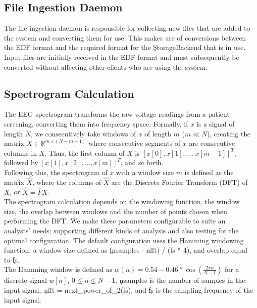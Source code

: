 \subsection{File Ingestion Daemon}

The file ingestion daemon is responsible for collecting new files that are
added to the system and converting them for use. This makes use of conversions
between the EDF format and the required format for the \c{StorageBackend} that
is in use. Input files are initially received in the EDF format and must
subsequently be converted without affecting other clients who are using the
system.

\subsection{Spectrogram Calculation}\label{compute-ch:design-spectrogram}

The EEG spectrogram transforms the raw voltage readings from a patient
screening, converting them into frequency space. Formally, if $x$ is a signal
of length $N$, we consecutively take windows of $x$ of length $m$ ($m \ll N$),
creating the matrix $X \in \mathbb{R}^{m \times (N - m + 1)}$ where consecutive
segments of $x$ are consecutive columns in $X$. Thus, the first column of $X$
is $[x[0], x[1], \ldots, x[m-1]]^T$, followed by $[x[1], x[2], \ldots,
x[m]]^T$, and so forth. \\

Following this, the spectrogram of $x$ with a window size $m$ is defined as the
matrix $\hat{X}$, where the columns of $\hat{X}$ are the Discrete Fourier
Transform (DFT) of $X$, or $\hat{X} = \bar{F}X$. \\

The spectrogram calculation depends on the windowing function, the window size,
the overlap between windows and the number of points chosen when performing the
DFT. We make these parameters configurable to suite an analysts' needs;
supporting different kinds of analysis and also testing for the optimal
configuration. The default configuration uses the Hamming windowing function, a
window size defined as \c{(nsamples - nfft) / (fs * 4)}, and overlap equal to
\c{fs}. \\

The Hamming window is defined as $w(n) = 0.54 - 0.46*\cos(\frac{2 \pi n}{N
  -1})$ for a discrete signal $w[n]$, $0 \leq n \leq N -1$. \c{nsamples} is the
number of samples in the input signal, \c{nfft = next\_power\_of\_2(fs)},
and \c{fs} is the sampling frequency of the input signal.

